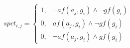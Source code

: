 \documentclass[a4paper]{article}
\begin{document}
\begin{equation}
spct_{i,j} =
\begin{cases}
1, & \text{$\neg af(a_j,g_i) \wedge \neg gf(g_i)$}\\
0, & \text{$af(a_j,g_i) \wedge \neg gf(g_i)$}\\
0, & \text{$\neg af(a_j,g_i) \wedge gf(g_i)$}
\end{cases}
\end{equation}
\end{document}
